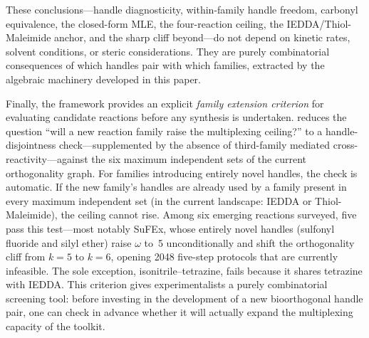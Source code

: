 \documentclass[preprint,12pt]{elsarticle}
\theoremstyle{definition}
\theoremstyle{remark}
\begin{document}
These conclusions---handle diagnosticity, within-family
handle freedom, carbonyl equivalence, the closed-form
MLE, the four-reaction ceiling, the IEDDA/Thiol-Maleimide
anchor, and the sharp cliff beyond---do not depend
on kinetic rates, solvent
conditions, or steric considerations.  They are purely combinatorial
consequences of which handles pair with which families, extracted by
the algebraic machinery developed in this paper.

Finally, the framework provides an explicit \emph{family extension
criterion} for evaluating candidate reactions before any synthesis is
undertaken.   reduces the question ``will
a new reaction family raise the multiplexing ceiling?'' to a
handle-disjointness check---supplemented by the absence of
third-family mediated cross-reactivity---against the six maximum
independent sets of the current orthogonality graph.  For families
introducing entirely novel handles, the check is automatic.  If
the new family's handles are already used by a family present in
every maximum independent set (in the current landscape: IEDDA or
Thiol-Maleimide), the ceiling cannot rise.  Among six emerging reactions surveyed, five
pass this test---most notably SuFEx, whose entirely novel handles
(sulfonyl fluoride and silyl ether) raise $\omega$ to~5
unconditionally and shift the orthogonality cliff from $k = 5$ to
$k = 6$, opening 2048 five-step protocols that are currently
infeasible.  The sole exception, isonitrile--tetrazine, fails because
it shares tetrazine with IEDDA.  This criterion gives experimentalists
a purely combinatorial screening tool: before investing in the
development of a new bioorthogonal handle pair, one can check in
advance whether it will actually expand the multiplexing capacity of
the toolkit.


\end{document}
